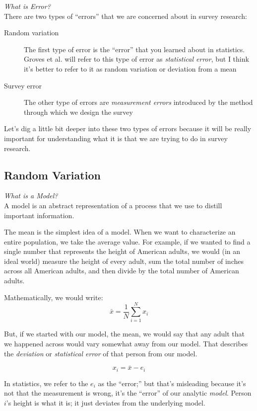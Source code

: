 \documentclass[11pt]{lecturenotes}
\begin{document}
\slide
\emph{What is Error?}\\
There are two types of ``errors'' that we are concerned about in survey research:

\begin{description}
\item[Random variation] The first type of error is the ``error'' that you learned about in statistics. Groves et al. will refer to this type of error as \emph{statistical error}, but I think it's better to refer to it as random variation or deviation from a mean
\item[Survey error] The other type of errors are \emph{measurement errors} introduced by the method through which we design the survey
\end{description}

Let's dig a little bit deeper into these two types of errors because it will be really important for understanding what it is that we are trying to do in survey research.

\subsection[10]{Random Variation}
\slide
\emph{What is a Model?}\\
A model is an abstract representation of a process that we use to distill important information. 

The mean is the simplest idea of a model. When we want to characterize an entire population, we take the average value. For example, if we wanted to find a single number that represents the height of American adults, we would (in an ideal world) measure the height of every adult, sum the total number of inches across all American adults, and then divide by the total number of American adults.

\slide
Mathematically, we would write: \[\bar{x}=\frac{1}{N}\sum^N_{i=1}{x_i}\] 

But, if we started with our model, the mean, we would say that any adult that we happened across would vary somewhat away from our model. That describes the \emph{deviation} or \emph{statistical error} of that person from our model. 

\[x_i = \bar{x} - e_i\]

In statistics, we refer to the $e_i$ as the ``error;'' but that's misleading because it's not that the measurement is wrong, it's the ``error'' of our analytic \emph{model}. Person $i$'s height is what it is; it just deviates from the underlying model. 
\end{document}
